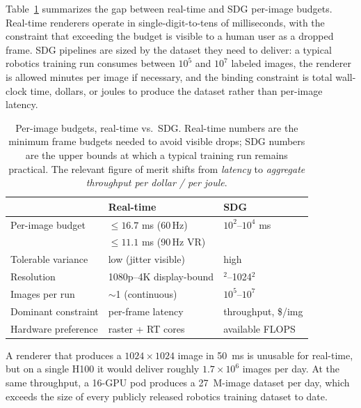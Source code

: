 \documentclass[10pt,journal]{IEEEtran}
\begin{document}
Table~\ref{tab:budgets} summarizes the gap between real-time and SDG
per-image budgets. Real-time renderers operate in single-digit-to-tens
of milliseconds, with the constraint that exceeding the budget is
visible to a human user as a dropped frame. SDG pipelines are sized by
the dataset they need to deliver: a typical robotics training run
consumes between $10^5$ and $10^7$ labeled images, the renderer is
allowed minutes per image if necessary, and the binding constraint is
total wall-clock time, dollars, or joules to produce the dataset
rather than per-image latency.

\begin{table}[t]
\centering
\caption{Per-image budgets, real-time vs.\ SDG. Real-time numbers are
the minimum frame budgets needed to avoid visible drops; SDG numbers
are the upper bounds at which a typical training run remains
practical. The relevant figure of merit shifts from \emph{latency} to
\emph{aggregate throughput per dollar / per joule}.}
\label{tab:budgets}
\footnotesize
\setlength{\tabcolsep}{2.5pt}
\renewcommand{\arraystretch}{1.12}
\begin{tabular}{@{}>{\raggedright\arraybackslash}p{}
                >{\raggedright\arraybackslash}p{}
                >{\raggedright\arraybackslash}p{}@{}}
\toprule
& \textbf{Real-time} & \textbf{SDG} \\
\midrule
Per-image budget         & $\leq 16.7$ ms (60\,Hz) & $10^2$--$10^4$ ms \\
                         & $\leq 11.1$ ms (90\,Hz VR)  & \\
Tolerable variance       & low (jitter visible)        & high \\
Resolution               & 1080p--4K display-bound     & 256$^2$--1024$^2$ \\
Images per run           & $\sim$1 (continuous)        & $10^5$--$10^7$ \\
Dominant constraint      & per-frame latency           & throughput, \$/img \\
Hardware preference      & raster + RT cores           & available FLOPS \\
\bottomrule
\end{tabular}
\end{table}

A renderer that produces a $1024{\times}1024$ image in 50~ms is
unusable for real-time, but on a single H100 it would deliver roughly
$1.7{\times}10^6$ images per day. At the same throughput, a 16-GPU pod
produces a 27~M-image dataset per day, which exceeds the size of every
publicly released robotics training dataset to date.
\end{document}
